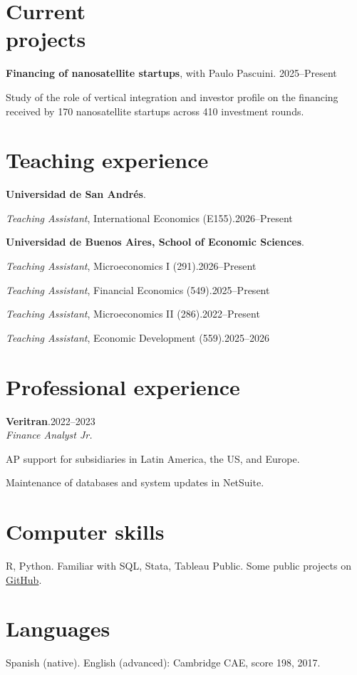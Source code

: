 \documentclass[11pt]{article}
\newcommand{\entrydate}[1]{\hfill{\small{#1}}}
\begin{document}
\section{Current\\projects}
\textbf{Financing of nanosatellite startups}, with Paulo Pascuini. \entrydate{2025--Present}
\begin{cvitems}
  \item Study of the role of vertical integration and investor profile on the financing received by 170 nanosatellite startups across 410 investment rounds.
\end{cvitems}

\section{Teaching experience}
\textbf{Universidad de San Andrés}.
\begin{cvitems}
  \item \textit{Teaching Assistant}, International Economics (E155).\entrydate{2026--Present}
\end{cvitems}

\textbf{Universidad de Buenos Aires, School of Economic Sciences}.
\begin{cvitems}
  \item \textit{Teaching Assistant}, Microeconomics I (291).\entrydate{2026--Present}
  \item \textit{Teaching Assistant}, Financial Economics (549).\entrydate{2025--Present}
  \item \textit{Teaching Assistant}, Microeconomics II (286).\entrydate{2022--Present}
  \item \textit{Teaching Assistant}, Economic Development (559).\entrydate{2025--2026}
\end{cvitems}

\section{Professional experience}
\textbf{Veritran}.\entrydate{2022--2023}\\
\textit{Finance Analyst Jr.}
\begin{cvitems}
  \item AP support for subsidiaries in Latin America, the US, and Europe.
  \item Maintenance of databases and system updates in NetSuite.
\end{cvitems}

\section{Computer skills}
    R, Python. Familiar with SQL, Stata, Tableau Public. Some public projects on \href{https://www.github.com/sanarovaz/}{GitHub}.
\section{Languages}
Spanish (native). English (advanced): Cambridge CAE, score 198, 2017.
\end{document}
